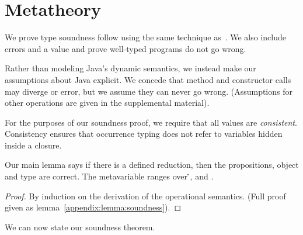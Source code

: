 \section{Metatheory}
\label{sec:metatheory}

We prove type soundness follow using the same technique as~\citet{TF10}. 
We also include errors and a \wrong{} value and prove
well-typed programs do not go wrong.

Rather than modeling Java's dynamic semantics, we instead
make our assumptions about Java explicit. We concede that
method and constructor calls may diverge or error, but we assume they can
never go wrong. (Assumptions for other operations are given in the supplemental
material).

{}





For the purposes of our soundness proof, we require that all values
are \emph{consistent}.
Consistency
ensures that occurrence typing does not refer to variables
hidden inside a closure.

{}

Our main lemma says if there is a defined reduction, then the propositions, object
and type are correct.
The metavariable  ranges over \v{}, \errorvalv{} and \wrong{}.

\begin{lemma}\label{main:lemma:soundness}

  {\soundnesslemmahypothesis}
  \begin{proof}
    By induction on the derivation of the operational semantics.
    (Full proof given as lemma~\ref{appendix:lemma:soundness}).
  \end{proof}
\end{lemma}


We can now state our soundness theorem.

{}

{}
%
